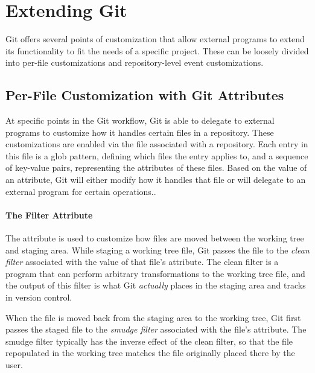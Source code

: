 \section{Extending Git} \label{sec:extending_git}
Git offers several points of customization that allow external programs to extend its functionality to fit the needs of a specific project. These can be loosely divided into per-file customizations and repository-level event customizations.

\subsection{Per-File Customization with Git Attributes}
At specific points in the Git workflow, Git is able to delegate to external programs to customize how it handles certain files in a repository. 
These customizations are enabled via the  file associated with a repository. Each entry in this file is a glob pattern, defining which files the entry applies to, and a sequence of key-value pairs, representing the attributes of these files. Based on the value of an attribute, Git will either modify how it handles that file or will delegate to an external program for certain operations.. 

\paragraph{The Filter Attribute}
The  attribute is used to customize how files are moved between the working tree and staging area.
While staging a working tree file, Git passes the file to the \emph{clean filter} associated with the value of that file's  attribute. The clean filter is a program that can perform arbitrary transformations to the working tree file, and the output of this filter is what Git \emph{actually} places in the staging area and tracks in version control.

When the file is moved back from the staging area to the working tree, Git first passes the staged file to the \emph{smudge filter} associated with the file's  attribute. The smudge filter typically has the inverse effect of the clean filter, so that the file repopulated in the working tree matches the file originally placed there by the user.

